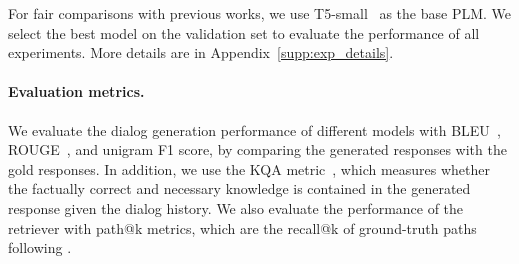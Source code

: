 

For fair comparisons with previous works, we use T5-small~\cite{roberts2019exploring} as the base PLM.
We select the best model on the validation set to evaluate the performance of all experiments.
More details are in Appendix~\ref{supp:exp_details}.



\paragraph{Evaluation metrics.}
We evaluate the dialog generation performance of different models with BLEU~\cite{papineni2002bleu}, ROUGE~\cite{lin2004rouge}, and unigram F1 score, by comparing the generated responses with the gold responses.
In addition, we use the KQA metric~\cite{kang2022knowledge}, which measures whether the factually correct and necessary knowledge is contained in the generated response given the dialog history. 
We also evaluate the performance of the retriever with path@k metrics, which are the recall@k of ground-truth paths following \cite{moon2019opendialkg,jung2020attnio}.